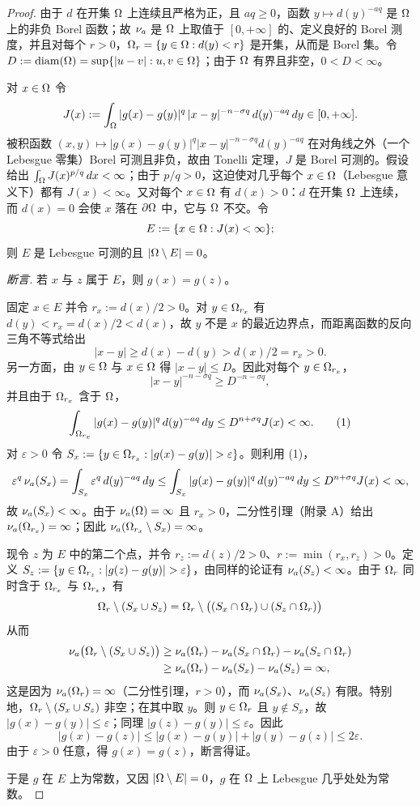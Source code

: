 \begin{proof}
由于 $d$ 在开集 $\Omega$ 上连续且严格为正，且 $aq\ge 0$，函数 $y\mapsto d(y)^{-aq}$ 是 $\Omega$ 上的非负 Borel 函数；故 $\nu_{a}$ 是 $\Omega$ 上取值于 $[0,+\infty]$ 的、定义良好的 Borel 测度，并且对每个 $r>0$，$\Omega_{r}=\{y\in\Omega : d(y)<r\}$ 是开集，从而是 Borel 集。令 $D:=\operatorname{diam}(\Omega)=\sup\{|u-v| : u,v\in\Omega\}$；由于 $\Omega$ 有界且非空，$0<D<\infty$。

对 $x\in\Omega$ 令
\[
  J(x):=\int_\Omega |g(x)-g(y)|^q\,|x-y|^{-n-\sigma q}\,d(y)^{-aq}\,dy\in[0,+\infty] .
\]
被积函数 $(x,y)\mapsto|g(x)-g(y)|^q|x-y|^{-n-\sigma q}d(y)^{-aq}$ 在对角线之外（一个 Lebesgue 零集）Borel 可测且非负，故由 Tonelli 定理，$J$ 是 Borel 可测的。假设给出 $\int_\Omega J(x)^{p/q}\,dx<\infty$；由于 $p/q>0$，这迫使对几乎每个 $x\in\Omega$（Lebesgue 意义下）都有 $J(x)<\infty$。又对每个 $x\in\Omega$ 有 $d(x)>0$：$d$ 在开集 $\Omega$ 上连续，而 $d(x)=0$ 会使 $x$ 落在 $\partial\Omega$ 中，它与 $\Omega$ 不交。令
\[
  E:=\{x\in\Omega : J(x)<\infty\} ;
\]
则 $E$ 是 Lebesgue 可测的且 $|\Omega\setminus E|=0$。

\emph{断言.} 若 $x$ 与 $z$ 属于 $E$，则 $g(x)=g(z)$。

固定 $x\in E$ 并令 $r_x:=d(x)/2>0$。对 $y\in\Omega_{r_x}$ 有 $d(y)<r_x=d(x)/2<d(x)$，故 $y$ 不是 $x$ 的最近边界点，而距离函数的反向三角不等式给出
\[
  |x-y|\ge d(x)-d(y)>d(x)/2=r_x>0 .
\]
另一方面，由 $y\in\Omega$ 与 $x\in\Omega$ 得 $|x-y|\le D$。因此对每个 $y\in\Omega_{r_x}$，
\[
  |x-y|^{-n-\sigma q}\ge D^{-n-\sigma q},
\]
并且由于 $\Omega_{r_x}$ 含于 $\Omega$，
\begin{equation}
  \int_{\Omega_{r_x}} |g(x)-g(y)|^q\,d(y)^{-aq}\,dy\le D^{n+\sigma q}J(x)<\infty . \tag{1}
\end{equation}
对 $\varepsilon>0$ 令 $S_x:=\{y\in\Om_{r_x} : |g(x)-g(y)|>\varepsilon\}$。则利用 (1)，
\[
  \varepsilon^q\,\nu_{a}(S_x)
  =\int_{S_x}\varepsilon^q\,d(y)^{-aq}\,dy
  \le\int_{S_x}|g(x)-g(y)|^q\,d(y)^{-aq}\,dy
  \le D^{n+\sigma q}J(x)<\infty ,
\]
故 $\nu_{a}(S_x)<\infty$。由于 $\nu_{a}(\Omega)=\infty$ 且 $r_x>0$，二分性引理（附录 A）给出 $\nu_{a}(\Omega_{r_x})=\infty$；因此 $\nu_{a}(\Omega_{r_x}\setminus S_x)=\infty$。

现令 $z$ 为 $E$ 中的第二个点，并令 $r_z:=d(z)/2>0$、$r:=\min(r_x,r_z)>0$。定义 $S_z:=\{y\in\Om_{r_z} : |g(z)-g(y)|>\varepsilon\}$，由同样的论证有 $\nu_{a}(S_z)<\infty$。由于 $\Omega_{r}$ 同时含于 $\Omega_{r_x}$ 与 $\Omega_{r_z}$，有
\[
  \Omega_{r}\setminus(S_x\cup S_z)=\Omega_{r}\setminus\big((S_x\cap\Omega_{r})\cup(S_z\cap\Omega_{r})\big)
\]
从而
\[
\begin{aligned}
  \nu_{a}\big(\Omega_{r}\setminus(S_x\cup S_z)\big)
  &\ge\nu_{a}(\Omega_{r})-\nu_{a}(S_x\cap\Omega_{r})-\nu_{a}(S_z\cap\Omega_{r})\\
  &\ge\nu_{a}(\Omega_{r})-\nu_{a}(S_x)-\nu_{a}(S_z)=\infty ,
\end{aligned}
\]
这是因为 $\nu_{a}(\Omega_{r})=\infty$（二分性引理，$r>0$），而 $\nu_{a}(S_x)$、$\nu_{a}(S_z)$ 有限。特别地，$\Omega_{r}\setminus(S_x\cup S_z)$ 非空；在其中取 $y$。则 $y\in\Omega_{r}$ 且 $y\notin S_x$，故 $|g(x)-g(y)|\le\varepsilon$；同理 $|g(z)-g(y)|\le\varepsilon$。因此
\[
  |g(x)-g(z)|\le|g(x)-g(y)|+|g(y)-g(z)|\le2\varepsilon .
\]
由于 $\varepsilon>0$ 任意，得 $g(x)=g(z)$，断言得证。

于是 $g$ 在 $E$ 上为常数，又因 $|\Omega\setminus E|=0$，$g$ 在 $\Omega$ 上 Lebesgue 几乎处处为常数。
\end{proof}

